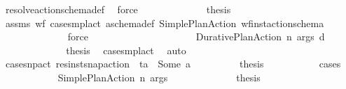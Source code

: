 \begin{isabellebody}
\ resolve{\isacharunderscore}{\kern0pt}action{\isacharunderscore}{\kern0pt}schema{\isacharunderscore}{\kern0pt}def\ \isamarkupfalse%
\ force\isanewline
\ \ \ \ \ \ \ \ \ \ \isamarkupfalse%
\ \isamarkupfalse%
\ {\isacharquery}{\kern0pt}thesis\isanewline
\ \ \ \ \ \ \ \ \ \ \ \ \isamarkupfalse%
\ assms\ wf{\isacharunderscore}{\kern0pt}{\isasympi}\ case{\isacharunderscore}{\kern0pt}smpl{\isacharunderscore}{\kern0pt}act\ a\isactrlsub s\isactrlsub c\isactrlsub h\isactrlsub e\isactrlsub m\isactrlsub a{\isacharunderscore}{\kern0pt}def\ Simple{\isacharunderscore}{\kern0pt}Plan{\isacharunderscore}{\kern0pt}Action\ wf{\isacharunderscore}{\kern0pt}inst{\isacharunderscore}{\kern0pt}action{\isacharunderscore}{\kern0pt}schema\ \isanewline
\ \ \ \ \ \ \ \ \ \ \ \ \isamarkupfalse%
\ force\ \isanewline
\ \ \ \ \ \ \ \ \isamarkupfalse%
\isanewline
\ \ \ \ \ \ \ \ \ \ \isamarkupfalse%
\ {\isacharparenleft}{\kern0pt}Durative{\isacharunderscore}{\kern0pt}Plan{\isacharunderscore}{\kern0pt}Action\ n\ args\ d{\isacharparenright}{\kern0pt}\isanewline
\ \ \ \ \ \ \ \ \ \ \isamarkupfalse%
\ \isamarkupfalse%
\ {\isacharquery}{\kern0pt}thesis\ \isamarkupfalse%
\ case{\isacharunderscore}{\kern0pt}smpl{\isacharunderscore}{\kern0pt}act\ \isamarkupfalse%
\ auto\isanewline
\ \ \ \ \ \ \ \ \isamarkupfalse%
\isanewline
\ \ \ \ \isamarkupfalse%
\isanewline
\ \ \ \ \ \ \isamarkupfalse%
\ case{\isacharunderscore}{\kern0pt}snp{\isacharunderscore}{\kern0pt}act{\isacharcolon}{\kern0pt}\ {\isachardoublequoteopen}res{\isacharunderscore}{\kern0pt}inst{\isacharunderscore}{\kern0pt}snap{\isacharunderscore}{\kern0pt}action\ {\isasympi}\ ta\ {\isacharequal}{\kern0pt}\ Some\ a{\isachardoublequoteclose}\isanewline
\ \ \ \ \ \ \isamarkupfalse%
\ \isamarkupfalse%
\ {\isacharquery}{\kern0pt}thesis\ \isanewline
\ \ \ \ \ \ \ \ \isamarkupfalse%
\ {\isacharparenleft}{\kern0pt}cases\ {\isasympi}{\isacharparenright}{\kern0pt}\isanewline
\ \ \ \ \ \ \ \ \ \ \isamarkupfalse%
\ {\isacharparenleft}{\kern0pt}Simple{\isacharunderscore}{\kern0pt}Plan{\isacharunderscore}{\kern0pt}Action\ n\ args{\isacharparenright}{\kern0pt}\isanewline
\ \ \ \ \ \ \ \ \ \ \isamarkupfalse%
\ \isamarkupfalse%
\ {\isacharquery}{\kern0pt}thesis\ \isamarkupfalse%

\end{isabellebody}
